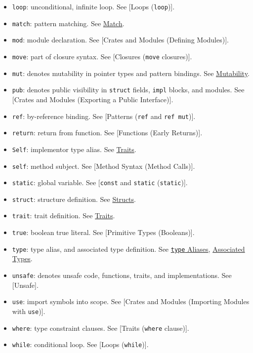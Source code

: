 \documentclass[a4paper,]{book}
\begin{document}
\begin{itemize}
\item
  \texttt{loop}: unconditional, infinite loop. See {[}Loops
  (\texttt{loop}){]}.
\item
  \texttt{match}: pattern matching. See
  \protect\hyperlink{sec--match}{Match}.
\item
  \texttt{mod}: module declaration. See {[}Crates and Modules (Defining
  Modules){]}.
\item
  \texttt{move}: part of closure syntax. See {[}Closures (\texttt{move}
  closures){]}.
\item
  \texttt{mut}: denotes mutability in pointer types and pattern
  bindings. See \protect\hyperlink{mutability-1}{Mutability}.
\item
  \texttt{pub}: denotes public visibility in \texttt{struct} fields,
  \texttt{impl} blocks, and modules. See {[}Crates and Modules
  (Exporting a Public Interface){]}.
\item
  \texttt{ref}: by-reference binding. See {[}Patterns (\texttt{ref} and
  \texttt{ref\ mut}){]}.
\item
  \texttt{return}: return from function. See {[}Functions (Early
  Returns){]}.
\item
  \texttt{Self}: implementor type alias. See
  \protect\hyperlink{sec--traits}{Traits}.
\item
  \texttt{self}: method subject. See {[}Method Syntax (Method Calls){]}.
\item
  \texttt{static}: global variable. See {[}\texttt{const} and
  \texttt{static} (\texttt{static}){]}.
\item
  \texttt{struct}: structure definition. See
  \protect\hyperlink{sec--structs}{Structs}.
\item
  \texttt{trait}: trait definition. See
  \protect\hyperlink{sec--traits}{Traits}.
\item
  \texttt{true}: boolean true literal. See {[}Primitive Types
  (Booleans){]}.
\item
  \texttt{type}: type alias, and associated type definition. See
  \protect\hyperlink{sec--type-aliases}{\texttt{type} Aliases},
  \protect\hyperlink{sec--associated-types}{Associated Types}.
\item
  \texttt{unsafe}: denotes unsafe code, functions, traits, and
  implementations. See {[}Unsafe{]}.
\item
  \texttt{use}: import symbols into scope. See {[}Crates and Modules
  (Importing Modules with \texttt{use}){]}.
\item
  \texttt{where}: type constraint clauses. See {[}Traits (\texttt{where}
  clause){]}.
\item
  \texttt{while}: conditional loop. See {[}Loops (\texttt{while}){]}.
\end{itemize}
\end{document}
